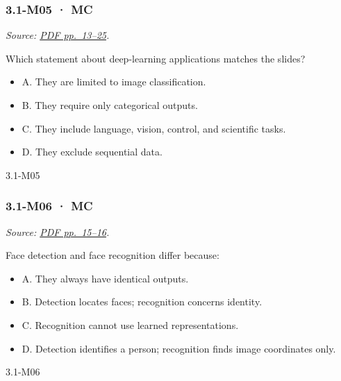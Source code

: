 \noindent\begin{minipage}{\linewidth}

\subsubsection{3.1-M05 · MC}\label{m05-mc-7}

\emph{Source:
\href{../Lecture\%20Slides/3.1.\%20Introduction\%20to\%20Deep\%20Learning.pdf\#page=13}{PDF
pp.~13--25}.}

Which statement about deep-learning applications matches the slides?

\begin{itemize}
\tightlist
\item
  A. They are limited to image classification.
\item
  B. They require only categorical outputs.
\item
  C. They include language, vision, control, and scientific tasks.
\item
  D. They exclude sequential data.
\end{itemize}

\begin{solution}[8mm]{3.1-M05}

\end{solution}
\end{minipage}\par\medskip

\noindent\begin{minipage}{\linewidth}

\subsubsection{3.1-M06 · MC}\label{m06-mc-7}

\emph{Source:
\href{../Lecture\%20Slides/3.1.\%20Introduction\%20to\%20Deep\%20Learning.pdf\#page=15}{PDF
pp.~15--16}.}

Face detection and face recognition differ because:

\begin{itemize}
\tightlist
\item
  A. They always have identical outputs.
\item
  B. Detection locates faces; recognition concerns identity.
\item
  C. Recognition cannot use learned representations.
\item
  D. Detection identifies a person; recognition finds image coordinates
  only.
\end{itemize}

\begin{solution}[8mm]{3.1-M06}

\end{solution}
\end{minipage}\par\medskip

